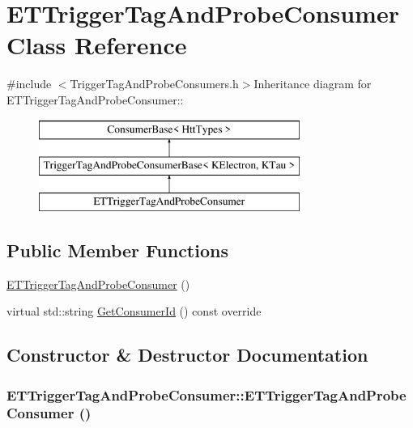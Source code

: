 \hypertarget{classETTriggerTagAndProbeConsumer}{
\section{ETTriggerTagAndProbeConsumer Class Reference}
\label{classETTriggerTagAndProbeConsumer}
}


{\ttfamily \#include $<$TriggerTagAndProbeConsumers.h$>$}Inheritance diagram for ETTriggerTagAndProbeConsumer::\begin{figure}[H]
\begin{center}
\leavevmode
\includegraphics[height=3cm]{classETTriggerTagAndProbeConsumer}
\end{center}
\end{figure}
\subsection*{Public Member Functions}
\begin{DoxyCompactItemize}
\item 
\hyperlink{classETTriggerTagAndProbeConsumer_a578730a8283d4db3f13265cbc9d3c358}{ETTriggerTagAndProbeConsumer} ()
\item 
virtual std::string \hyperlink{classETTriggerTagAndProbeConsumer_ab7ff099dd475a066450c68ab593bddf4}{GetConsumerId} () const override
\end{DoxyCompactItemize}


\subsection{Constructor \& Destructor Documentation}
\hypertarget{classETTriggerTagAndProbeConsumer_a578730a8283d4db3f13265cbc9d3c358}{
\subsubsection[{ETTriggerTagAndProbeConsumer}]{\setlength{\rightskip}{0pt plus 5cm}ETTriggerTagAndProbeConsumer::ETTriggerTagAndProbeConsumer ()}}
\label{classETTriggerTagAndProbeConsumer_a578730a8283d4db3f13265cbc9d3c358}


